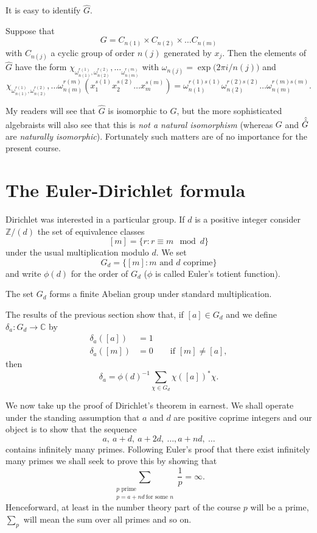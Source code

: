It is easy to identify $\hat{G}$.
\begin{lemma} Suppose that
\[G=C_{n(1)}\times C_{n(2)}\times \dots C_{n(m)}\]
with $C_{n(j)}$ a cyclic group of order $n(j)$ generated
by $x_{j}$. Then the elements of $\hat{G}$ have the
form
$\chi_{\omega_{n(1)}^{r(1)},\omega_{n(2)}^{r(2)}},\dots
_{\omega_{n(m)}^{r(m)}}$ with $\omega_{n(j)}=\exp\big(2\pi i/n(j)\big)$
and
\[\chi_{\omega_{n(1)}^{r(1)},\omega_{n(2)}^{r(2)}},\dots
\omega_{n(m)}^{r(m)}(x_{1}^{s(1)}x_{2}^{s(2)}\dots x_{m}^{s(m)})
=\omega_{n(1)}^{r(1)s(1)}\omega_{n(2)}^{r(2)s(2)}\dots
\omega_{n(m)}^{r(m)s(m)}.\]
\end{lemma}
My readers will see that $\hat{G}$ is isomorphic to $G$,
but the more sophisticated algebraists will also
see that this is \emph{not a natural isomorphism}
(whereas $G$ and $\Hat{\Hat{G}}$ are \emph{naturally isomorphic}).
Fortunately such matters are of no importance
for the present course.
\section{The Euler-Dirichlet formula} Dirichlet was interested
in a particular group. If $d$ is a positive integer consider
${\mathbb Z}/(d)$ the set of equivalence classes
\[[m]=\{r:r\equiv m \mod{d}\}\]
under the usual multiplication modulo $d$.
We set
\[G_{d}=\{[m]:\text{$m$ and $d$ coprime}\}\]
and write $\phi(d)$ for the order of $G_{d}$ ($\phi$ is
called Euler's totient function).
\begin{lemma} The set $G_{d}$ forms a finite
Abelian group under
standard multiplication.
\end{lemma}
The results of the previous section show that, if $[a]\in G_{d}$
and we define $\delta_{a}:G_{d}\rightarrow{\mathbb C}$ by
\begin{align*}
\delta_{a}([a])&=1\\
\delta_{a}([m])&=0\qquad \text{if $[m]\neq [a]$},
\end{align*}
then
\[\delta_{a}=\phi(d)^{-1}\sum_{\chi\in G_{d}}\chi([a])^{*}\chi.\]

We now take up the proof of Dirichlet's theorem in earnest.
We shall operate under the standing assumption that $a$ and $d$
are positive coprime integers and our object is to show
that the sequence
\[a,\ a+d,\ a+2d,\ \dots, a+nd,\ \dots\]
contains infinitely many primes. Following
Euler's proof that there exist infinitely many primes
we shall seek to prove this by showing that
\[\sum_{\substack{\text{$p$ prime}\\p=a+nd\ \text{for some $n$}}}
\frac{1}{p}=\infty.\]
Henceforward, at least in the number theory part of the
course $p$ will be a prime,  $\sum_{p}$ will mean the
sum over all primes and so on.

